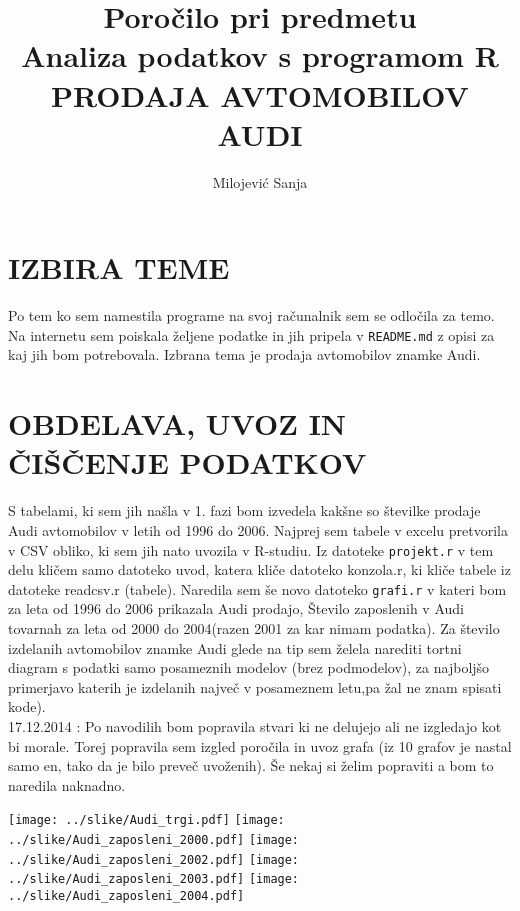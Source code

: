 \documentclass[11pt,a4paper]{article}
\begin{document}
\title{Poročilo pri predmetu \\
Analiza podatkov s programom R\\
PRODAJA AVTOMOBILOV AUDI}
\author{Milojević Sanja}
\maketitle

\section{IZBIRA TEME}
Po tem ko sem namestila programe na svoj računalnik sem se odločila za temo. Na internetu sem poiskala željene podatke in jih pripela v \verb|README.md| z opisi za kaj jih bom potrebovala. Izbrana tema je prodaja avtomobilov znamke Audi.

\section{OBDELAVA, UVOZ IN ČIŠČENJE PODATKOV}
S tabelami, ki sem jih našla v 1. fazi bom izvedela kakšne so številke prodaje Audi avtomobilov v letih od 1996 do 2006. Najprej sem tabele v excelu pretvorila v CSV obliko, ki sem jih nato uvozila v R-studiu. Iz datoteke \verb|projekt.r| v tem delu kličem samo datoteko uvod, katera kliče datoteko konzola.r, ki kliče tabele iz datoteke readcsv.r (tabele).
Naredila sem še novo datoteko \verb|grafi.r| v kateri bom za leta od 1996 do 2006 prikazala Audi prodajo, Število zaposlenih v Audi tovarnah za leta od 2000 do 2004(razen 2001 za kar nimam podatka). Za število izdelanih avtomobilov znamke Audi glede na tip sem želela narediti tortni diagram s podatki samo posameznih modelov (brez podmodelov), za najboljšo primerjavo katerih je izdelanih največ v posameznem letu,pa žal ne znam spisati kode).\\
17.12.2014 : Po navodilih bom popravila stvari ki ne delujejo ali ne izgledajo kot bi morale. Torej popravila sem izgled poročila in uvoz grafa (iz 10 grafov je nastal samo en, tako da je bilo preveč uvoženih). Še nekaj si želim popraviti a bom to naredila naknadno.

\texttt{[image: ../slike/Audi\_trgi.pdf]}
\texttt{[image: ../slike/Audi\_zaposleni\_2000.pdf]}
\texttt{[image: ../slike/Audi\_zaposleni\_2002.pdf]}
\texttt{[image: ../slike/Audi\_zaposleni\_2003.pdf]}
\texttt{[image: ../slike/Audi\_zaposleni\_2004.pdf]}
\end{document}
